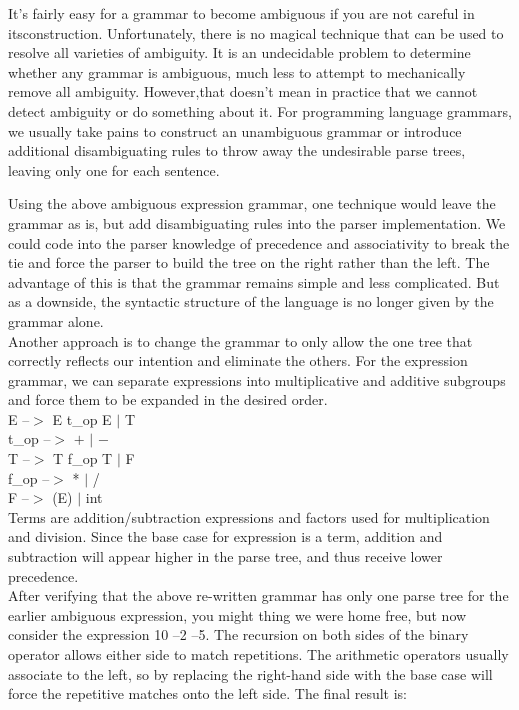 \begin{enumerate}
It’s fairly easy for a grammar to become ambiguous if you are not careful in itsconstruction. Unfortunately, there is no magical technique that can be used to resolve all varieties of ambiguity. It is an undecidable problem to determine whether any grammar
is ambiguous, much less to attempt to mechanically remove all ambiguity. However,that doesn't mean in practice that we cannot detect ambiguity or do something about it. For programming language grammars, we usually take pains to construct an unambiguous grammar or introduce additional disambiguating rules to throw away the
undesirable parse trees, leaving only one for each sentence.




Using the above ambiguous expression grammar, one technique would leave the grammar as is, but add disambiguating rules into the parser implementation. We could code into the parser knowledge of precedence and associativity to break the tie and force the parser to build the tree on the right rather than the left. The advantage of this is that the grammar remains simple and less complicated. But as a downside, the syntactic structure of the language is no longer given by the grammar alone.\\

Another approach is to change the grammar to only allow the one tree that correctly reflects our intention and eliminate the others. For the expression grammar, we can separate expressions into multiplicative and additive subgroups and force them to be
expanded in the desired order.\\



E $–>$ E t\_op E $|$ T\\
t\_op $–>$ $+$ $|$ $-$\\
T $–>$ T f\_op T $|$ F\\
f\_op $–>$ * $|$ /\\
F $–>$ (E) $|$ int\\


Terms are addition/subtraction expressions and factors used for multiplication and division. Since the base case for expression is a term, addition and subtraction will appear higher in the parse tree, and thus receive lower precedence.\\

After verifying that the above re-written grammar has only one parse tree for the earlier ambiguous expression, you might thing we were home free, but now consider the expression 10 –2 –5. The recursion on both sides of the binary operator allows either
side to match repetitions. The arithmetic operators usually associate to the left, so by replacing the right-hand side with the base case will force the repetitive matches onto the
left side. The final result is:\\


\end{enumerate}
